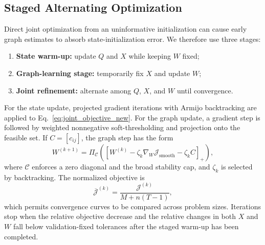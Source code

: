 \subsection{Staged Alternating Optimization}
\label{subsec:staged_optimization}
Direct joint optimization from an uninformative initialization can cause early graph estimates to absorb state-initialization error. We therefore use three stages:
\begin{enumerate}
    \item \textbf{State warm-up:} update $Q$ and $X$ while keeping $W$ fixed;
    \item \textbf{Graph-learning stage:} temporarily fix $X$ and update $W$;
    \item \textbf{Joint refinement:} alternate among $Q$, $X$, and $W$ until convergence.
\end{enumerate}

For the state update, projected gradient iterations with Armijo backtracking are applied to Eq.~\eqref{eq:joint_objective_new}. For the graph update, a gradient step is followed by weighted nonnegative soft-thresholding and projection onto the feasible set. If $C=[c_{ij}]$, the graph step has the form
\begin{equation}
    W^{(k+1)}
    =\Pi_{\mathcal{C}}
    \left(
    \left[W^{(k)}-\zeta_k\nabla_W\mathcal{J}_{\mathrm{smooth}}
    -\zeta_k C\right]_{+}
    \right),
    \label{eq:proximal_graph_update_new}
\end{equation}
where $\mathcal{C}$ enforces a zero diagonal and the broad stability cap, and $\zeta_k$ is selected by backtracking. The normalized objective is
\begin{equation}
    \overline{\mathcal{J}}^{(k)}
    =\frac{\mathcal{J}^{(k)}}{M+n(T-1)},
    \label{eq:normalized_objective_new}
\end{equation}
which permits convergence curves to be compared across problem sizes. Iterations stop when the relative objective decrease and the relative changes in both $X$ and $W$ fall below validation-fixed tolerances after the staged warm-up has been completed.


